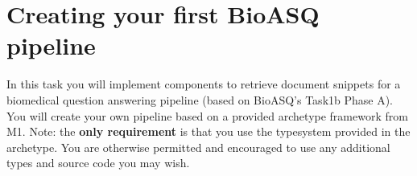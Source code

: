 
%
\chapter{Creating your first BioASQ pipeline}
\vspace{-1cm}
In this task you will implement components to retrieve document snippets for a biomedical question answering pipeline (based on BioASQ's Task1b Phase A). You will create your own pipeline based on a provided archetype framework from M1. Note: the \textbf{only requirement} is that you use the typesystem provided in the archetype. You are otherwise permitted and encouraged to use any additional types and source code you may wish.


%
